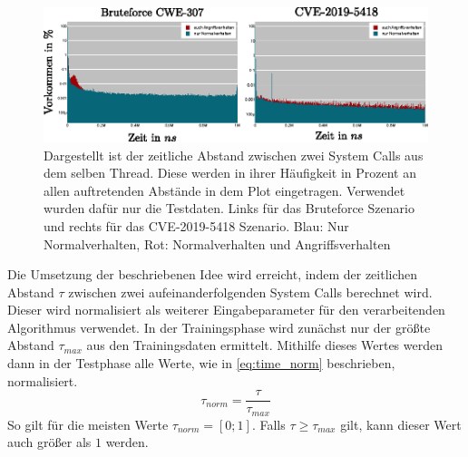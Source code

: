                     \begin{figure}
                        \centering
                        \includegraphics[width=\textwidth]{images/CVE-2012--Test-data-time_delta.eps}
                        \caption[Zeitliche Abstände zwischen System Calls]{Dargestellt ist der zeitliche Abstand zwischen zwei System Calls aus dem selben Thread.
                                 Diese werden in ihrer Häufigkeit in Prozent an allen auftretenden Abstände in dem Plot eingetragen.
                                 Verwendet wurden dafür nur die Testdaten. Links für das Bruteforce Szenario und rechts für das CVE-2019-5418 Szenario.
                                 Blau: Nur Normalverhalten, Rot: Normalverhalten und Angriffsverhalten}
                        \label{fig:time_delta}
                    \end{figure}

                    Die Umsetzung der beschriebenen Idee wird erreicht, indem der zeitlichen Abstand $\tau$ zwischen zwei aufeinanderfolgenden System Calls berechnet wird.
                    Dieser wird normalisiert als weiterer Eingabeparameter für den verarbeitenden Algorithmus verwendet.
                    In der Trainingsphase wird zunächst nur der größte Abstand $\tau_{max}$ aus den Trainingsdaten ermittelt.
                    Mithilfe dieses Wertes werden dann in der Testphase alle Werte, wie in \autoref{eq:time_norm} beschrieben, normalisiert.
                    \begin{equation}\label{eq:time_norm}
                        \tau_{norm} = \frac{\tau}{\tau_{max}}
                    \end{equation}
                    So gilt für die meisten Werte $\tau_{norm}=[0;1]$.
                    Falls $\tau\geq\tau_{max}$ gilt, kann dieser Wert auch größer als $1$ werden.\par\medskip

